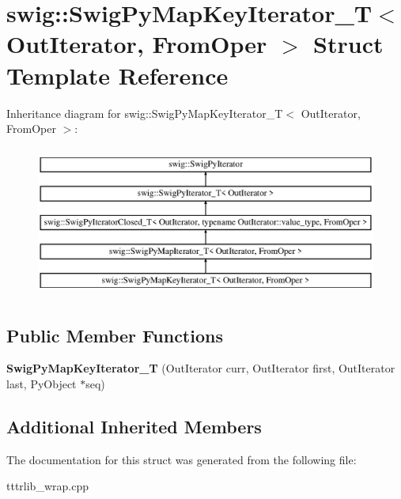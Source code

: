 \hypertarget{structswig_1_1_swig_py_map_key_iterator___t}{}\section{swig\+:\+:Swig\+Py\+Map\+Key\+Iterator\+\_\+T$<$ Out\+Iterator, From\+Oper $>$ Struct Template Reference}
\label{structswig_1_1_swig_py_map_key_iterator___t}
Inheritance diagram for swig\+:\+:Swig\+Py\+Map\+Key\+Iterator\+\_\+T$<$ Out\+Iterator, From\+Oper $>$\+:\begin{figure}[H]
\begin{center}
\leavevmode
\includegraphics[height=5.000000cm]{structswig_1_1_swig_py_map_key_iterator___t}
\end{center}
\end{figure}
\subsection*{Public Member Functions}
\begin{DoxyCompactItemize}
\item 
\mbox{\label{structswig_1_1_swig_py_map_key_iterator___t_ac666b974a2e029753404d74665590daf}} 
{\bfseries Swig\+Py\+Map\+Key\+Iterator\+\_\+T} (Out\+Iterator curr, Out\+Iterator first, Out\+Iterator last, Py\+Object $\ast$seq)
\end{DoxyCompactItemize}
\subsection*{Additional Inherited Members}


The documentation for this struct was generated from the following file\+:\begin{DoxyCompactItemize}
\item 
tttrlib\+\_\+wrap.\+cpp\end{DoxyCompactItemize}
